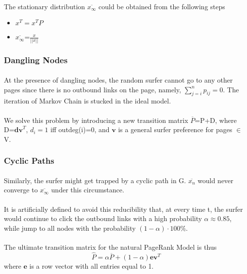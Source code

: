 \documentclass{article}
\begin{document}
        \paragraph{}
        The stationary distribution $\overline{x_\infty}$ could be obtained from the following steps
        \begin{itemize}
            \item $x^T=x^TP$
            \item $\overline{x_\infty}$=$\frac{x}{||x||}$
        \end{itemize}
        \subsubsection{Dangling Nodes}
        \paragraph{}
        At the presence of dangling nodes, the random surfer cannot go to any other pages since there is no outbound links on the page, namely, $\sum^n_{j=i}p_{ij}=0$. 
        The iteration of Markov Chain is stucked in the ideal model.
        \paragraph{}
        We solve this problem by introducing a new transition matrix $\overline{P}$=P+D, where D=$\textbf{dv}^T$, $d_i=1$ iff outdeg(i)=0, and $\textbf{v}$ is a general surfer preference for pages $\in$ V.
        \subsubsection{Cyclic Paths}
        \paragraph{}
        Similarly, the surfer might get trapped by a cyclic path in G. $\overline{x_n}$ would never converge to $\overline{x_\infty}$ under this circumstance.
        \paragraph{}
        It is artificially defined to avoid this reducibility that, at every time t, the surfer would continue to click the outbound links with a high probability $\alpha\approx0.85$, while jump to all nodes with the probability $(1-\alpha)\cdot100\%$.
        \paragraph{}
        The ultimate transition matrix for the natural PageRank Model is thus
        $$\hat{P}=\alpha\overline{P}+(1-\alpha)\textbf{ev}^T$$
        where $\textbf{e}$ is a row vector with all entries equal to 1.
\end{document}
